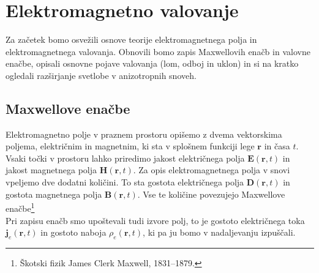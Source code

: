 
\chapter{Elektromagnetno valovanje}
Za začetek bomo osvežili osnove teorije elektromagnetnega polja in 
elektromagnetnega valovanja. Obnovili bomo zapis Maxwellovih enačb in 
valovne enačbe, opisali osnovne pojave valovanja (lom, odboj in uklon)
in si na kratko ogledali razširjanje svetlobe v anizotropnih snoveh. 

\section{Maxwellove enačbe}
Elektromagnetno polje v praznem prostoru opišemo z dvema vektorskima
poljema, električnim in magnetnim, ki sta v splošnem funkciji lege $\mathbf{r}$
in časa $t$. Vsaki točki v prostoru lahko priredimo jakost
električnega polja $\mathbf{E}(\mathbf{r},t)$ in jakost
magnetnega polja $\mathbf{H}(\mathbf{r},t)$. Za opis elektromagnetnega
polja v snovi vpeljemo dve dodatni količini. To sta gostota
električnega polja $\mathbf{D}(\mathbf{r},t)$ in gostota magnetnega
polja $\mathbf{B}(\mathbf{r},t)$.
Vse te količine povezujejo Maxwellove
enačbe\footnote{Škotski fizik James Clerk Maxwell, 1831--1879.}
\\
Pri zapisu enačb smo upoštevali tudi izvore polj, to je gostoto
električnega toka $\mathbf{j}_e(\mathbf{r},t)$ in gostoto naboja $\rho_{e}(\mathbf{r},t)$, ki 
pa ju bomo v nadaljevanju izpuščali.

